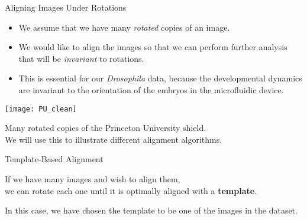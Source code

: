 \begin{frame}{Aligning Images Under Rotations}
	
	\begin{itemize}
	\item We assume that we have many {\em rotated} copies of an image.
	\item We would like to align the images so that we can perform further analysis that will be {\em invariant} to rotations. 
	\item This is essential for our {\em Drosophila} data, because the developmental dynamics are invariant to the orientation of the embryos in the microfluidic device.
	\end{itemize}

	\centering
	\texttt{[image: PU\_clean]}\\
	{\scriptsize Many rotated copies of the Princeton University shield. \\ We will use this to illustrate different alignment algorithms. \par}	

\end{frame}

\begin{frame}{Template-Based Alignment}
	\centering	
	
	If we have many images and wish to align them, \\ we can rotate each one until it is optimally aligned with a {\bf template}.

	In this case, we have chosen the template to be one of the images in the dataset.

		
\end{frame}

